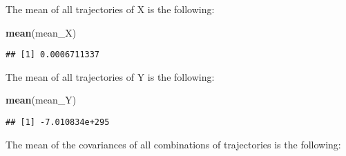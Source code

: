 \documentclass[]{article}
\newenvironment{Shaded}{\begin{snugshade}}{\end{snugshade}}
\newcommand{\ControlFlowTok}[1]{\textcolor[rgb]{0.13,0.29,0.53}{\textbf{#1}}}
\newcommand{\DecValTok}[1]{\textcolor[rgb]{0.00,0.00,0.81}{#1}}
\newcommand{\KeywordTok}[1]{\textcolor[rgb]{0.13,0.29,0.53}{\textbf{#1}}}
\newcommand{\NormalTok}[1]{#1}
\newcommand{\OperatorTok}[1]{\textcolor[rgb]{0.81,0.36,0.00}{\textbf{#1}}}
\newcommand{\StringTok}[1]{\textcolor[rgb]{0.31,0.60,0.02}{#1}}
\begin{document}
The mean of all trajectories of X is the following:

\begin{Shaded}
\begin{Highlighting}[]
\KeywordTok{mean}\NormalTok{(mean_X)}
\end{Highlighting}
\end{Shaded}

\begin{verbatim}
## [1] 0.0006711337
\end{verbatim}

The mean of all trajectories of Y is the following:

\begin{Shaded}
\begin{Highlighting}[]
\KeywordTok{mean}\NormalTok{(mean_Y)}
\end{Highlighting}
\end{Shaded}

\begin{verbatim}
## [1] -7.010834e+295
\end{verbatim}

The mean of the covariances of all combinations of trajectories is the
following:

\begin{Shaded}
\end{Shaded}
\end{document}
